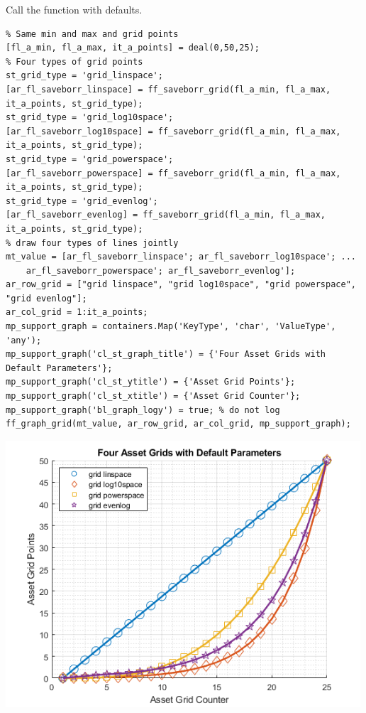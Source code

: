 \documentclass[
]{book}
\begin{document}
Call the function with defaults.

\begin{verbatim}
% Same min and max and grid points
[fl_a_min, fl_a_max, it_a_points] = deal(0,50,25);
% Four types of grid points
st_grid_type = 'grid_linspace';
[ar_fl_saveborr_linspace] = ff_saveborr_grid(fl_a_min, fl_a_max, it_a_points, st_grid_type);
st_grid_type = 'grid_log10space';
[ar_fl_saveborr_log10space] = ff_saveborr_grid(fl_a_min, fl_a_max, it_a_points, st_grid_type);
st_grid_type = 'grid_powerspace';
[ar_fl_saveborr_powerspace] = ff_saveborr_grid(fl_a_min, fl_a_max, it_a_points, st_grid_type);
st_grid_type = 'grid_evenlog';
[ar_fl_saveborr_evenlog] = ff_saveborr_grid(fl_a_min, fl_a_max, it_a_points, st_grid_type);
% draw four types of lines jointly
mt_value = [ar_fl_saveborr_linspace'; ar_fl_saveborr_log10space'; ...
    ar_fl_saveborr_powerspace'; ar_fl_saveborr_evenlog'];
ar_row_grid = ["grid linspace", "grid log10space", "grid powerspace", "grid evenlog"];
ar_col_grid = 1:it_a_points;
mp_support_graph = containers.Map('KeyType', 'char', 'ValueType', 'any');
mp_support_graph('cl_st_graph_title') = {'Four Asset Grids with Default Parameters'};
mp_support_graph('cl_st_ytitle') = {'Asset Grid Points'};
mp_support_graph('cl_st_xtitle') = {'Asset Grid Counter'};
mp_support_graph('bl_graph_logy') = true; % do not log
ff_graph_grid(mt_value, ar_row_grid, ar_col_grid, mp_support_graph);
\end{verbatim}

\includegraphics[width=5.20833in,height=\textheight]{img/fx_saveborr_grid_images/figure_0.png}
\end{document}
